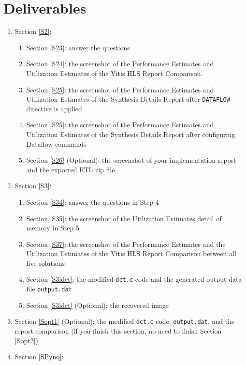 \documentclass[a4paper,12pt,twoside]{article}
\begin{document}
\section{Deliverables}
\begin{enumerate}
    \item Section \ref{S2}:
    \begin{enumerate}
        \item Section \ref{S23}: answer the questions
        \item Section \ref{S24}: the screenshot of the Performance Estimates and Utilization Estimates of the Vitis HLS Report Comparison.
        \item Section \ref{S25}: the screenshot of the Performance Estimates and Utilization Estimates of the Synthesis Details Report after \texttt{DATAFLOW} directive is applied
        \item Section \ref{S25}: the screenshot of the Performance Estimates and Utilization Estimates of the Synthesis Details Report after configuring Dataflow commands
        \item Section \ref{S26} (Optional): the screenshot of your implementation report and the exported RTL zip file
    \end{enumerate}
    \item Section \ref{S3}:
    \begin{enumerate}
        \item Section \ref{S34}: answer the questions in Step 4
        \item Section \ref{S35}: the screenshot of the Utilization Estimates detail of memory in Step 5
        \item Section \ref{S37}: the screenshot of the Performance Estimates and the Utilization Estimates of the Vitis HLS Report Comparison between all five solutions
        \item Section \ref{S3idct}: the modified \texttt{dct.c} code and the generated output data file \texttt{output.dat}
        \item Section \ref{S3idct} (Optional): the recovered image
    \end{enumerate}
    \item Section \ref{Sopt1} (Optional): the modified \texttt{dct.c} code, \texttt{output.dat}, and the report comparison (if you finish this section, no need to finish Section \ref{Sopt2})
    \item Section \ref{SPynq}:
    \begin{enumerate}

\end{enumerate}
\end{enumerate}
\end{document}
